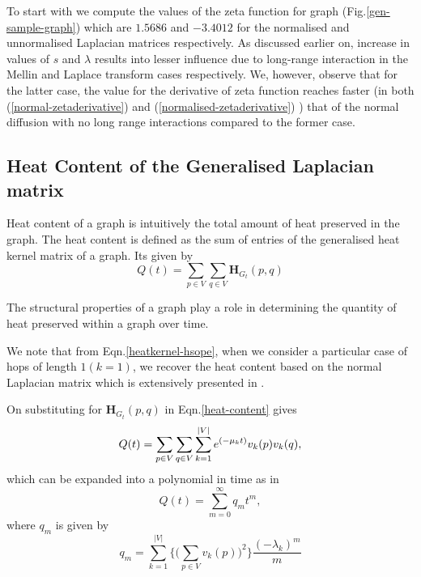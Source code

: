 \documentclass[10pt,a4paper]{article}
\theoremstyle{plain}
\theoremstyle{definition}
\begin{document}
    To start with we compute the values of the zeta function for graph (Fig.\ref{gen-sample-graph}) which are $1.5686$ and $-3.4012$ for the normalised and unnormalised Laplacian matrices respectively. As discussed earlier on, increase in values of $s$ and $\lambda$ results into lesser influence due to long-range interaction in the Mellin and Laplace transform cases respectively. We, however, observe that for the latter case, the value for the derivative of zeta function reaches faster (in both (\ref{normal-zetaderivative}) and (\ref{normalised-zetaderivative}) ) that of the normal diffusion with no long range interactions compared to the former case.     
    
    \subsection{Heat Content of the Generalised Laplacian matrix}
    Heat content of a graph is intuitively the total amount of heat preserved in the graph.
    The heat content is defined as the sum of entries of the generalised heat kernel matrix of a graph. Its given by
    \begin{equation}
    Q(t) = \sum_{p \in V} \sum_{q \in V} \mathbf{H}_{G_t}(p,q)
    \label{heat-content}
    \end{equation}
    
    The structural properties of a graph play a role in determining the quantity of heat preserved within a graph over time.
    
    We note that from Eqn.\ref{heatkernel-hsope}, when we consider a particular case of hops of length $1 (k=1)$, we recover the heat content based on the normal Laplacian matrix which is extensively presented in \citep{xiao2009graph}.
    
    On substituting for $\mathbf{H}_{G_t}(p,q)$ in Eqn.\ref{heat-content} gives
    \begin{equation}
    Q(t) = \sum_{p \in V} \sum_{q \in V} \sum_{k=1}^{\arrowvert V\arrowvert} e^{(-\mu_{k} t)} v_{k}(p) v_{k}(q),
    \label{heatcontentdecomp}
    \end{equation}
    which can be expanded into a polynomial in time as in \citep{mcdonald2002diffusions}
    \begin{equation}
    Q(t) = \sum_{m=0}^{\infty} q_m t^m,
    \end{equation}
    where $q_m$ is given by
    \begin{equation}
    q_m  = \sum_{k=1}^{|V|} \Bigg\{ \bigg(\sum_{p\in V}v_{k} (p)\bigg)^2 \Bigg\} \frac{(-\lambda_k)^m}{m}
    \end{equation}
    
\end{document}
